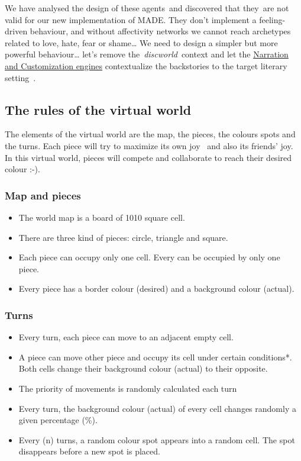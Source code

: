 \documentclass[a4paper]{article}
\newcommand\textstyleEmphasis[1]{\textit{#1}}
\newcommand\liststyleLi{%
\renewcommand\labelitemi{{\textbullet}}
\renewcommand\labelitemii{{\textbullet}}
\renewcommand\labelitemiii{{\textbullet}}
\renewcommand\labelitemiv{{\textbullet}}
}
\newcommand\liststyleLxii{%
\renewcommand\labelitemi{{\textbullet}}
\renewcommand\labelitemii{{\textbullet}}
\renewcommand\labelitemiii{{\textbullet}}
\renewcommand\labelitemiv{{\textbullet}}
}
\begin{document}
We have analysed the design of these agents~and discovered that they~are
not valid for our new implementation of MADE. They
don{\textquoteright}t implement a feeling-driven behaviour, and without
affectivity networks we cannot reach archetypes related to love, hate,
fear or shame{\dots} We need to design a simpler but more powerful
behaviour{\dots} let{\textquoteright}s remove
the~\textstyleEmphasis{discworld}~context and let the
\href{http://www.velonuboso.com/made/2015/06/27/making-part-8-component-stack-dataflow/}{Narration
and Customization engines} contextualize the backstories to the target
literary setting~.

\subsection{The rules of the virtual world}
The elements of the virtual world are the map, the pieces, the colours
spots and the turns. Each piece will try to maximize its own joy ~and
also its friends{\textquoteright} joy. In this virtual world, pieces
will compete and collaborate to reach their desired colour :-).

\subsubsection{Map and pieces}
\liststyleLi
\begin{itemize}
\item The world map is a board of 10{\texttimes}10 square cell. 
\item There are three kind of pieces: circle, triangle and square. 
\item Each piece can occupy only one cell. Every can be occupied by only
one piece. 
\item Every piece has a border colour (desired) and a background colour
(actual). 
\end{itemize}
\subsubsection{Turns}
\liststyleLxii
\begin{itemize}
\item Every turn, each piece can move to an adjacent empty cell. 
\item A piece can move other piece and occupy its cell under certain
conditions*. Both cells change their background colour (actual) to
their opposite. 
\item The priority of movements is randomly calculated each turn 
\item Every turn, the background colour (actual) of every cell changes
randomly a given percentage (\%). 
\item Every (n) turns, a random colour spot appears into a random cell.
The spot disappears before a new spot is placed. 
\end{itemize}
\end{document}
